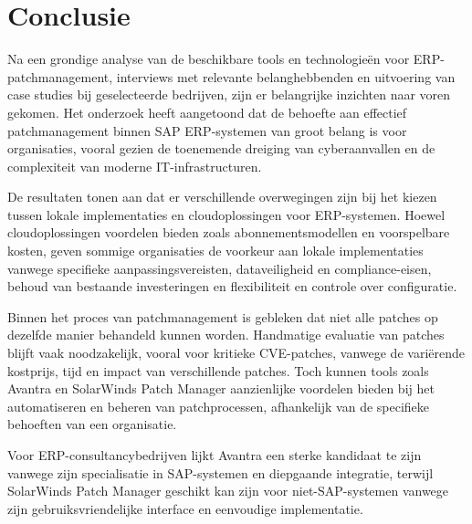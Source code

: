
\chapter{Conclusie}%
\label{ch:conclusie}


Na een grondige analyse van de beschikbare tools en technologieën voor ERP-patchmanagement, interviews met relevante belanghebbenden en uitvoering van case studies bij geselecteerde bedrijven, zijn er belangrijke inzichten naar voren 
gekomen. Het onderzoek heeft aangetoond dat de behoefte aan effectief patchmanagement binnen SAP ERP-systemen van groot belang is voor organisaties, vooral gezien de toenemende dreiging van cyberaanvallen en de complexiteit van moderne IT-infrastructuren.

De resultaten tonen aan dat er verschillende overwegingen zijn bij het kiezen tussen lokale implementaties en cloudoplossingen voor ERP-systemen. Hoewel cloudoplossingen voordelen bieden zoals abonnementsmodellen en voorspelbare kosten, 
geven sommige organisaties de voorkeur aan lokale implementaties vanwege specifieke aanpassingsvereisten, dataveiligheid en compliance-eisen, behoud van bestaande investeringen en flexibiliteit en controle over configuratie.

Binnen het proces van patchmanagement is gebleken dat niet alle patches op dezelfde manier behandeld kunnen worden. Handmatige evaluatie van patches blijft vaak noodzakelijk, vooral voor kritieke CVE-patches, vanwege de variërende kostprijs,
 tijd en impact van verschillende patches. Toch kunnen tools zoals Avantra en SolarWinds Patch Manager aanzienlijke voordelen bieden bij het automatiseren en beheren van patchprocessen, afhankelijk van de specifieke behoeften van een organisatie.

Voor ERP-consultancybedrijven lijkt Avantra een sterke kandidaat te zijn vanwege zijn specialisatie in SAP-systemen en diepgaande integratie, terwijl SolarWinds Patch Manager geschikt kan zijn voor niet-SAP-systemen vanwege zijn gebruiksvriendelijke interface en eenvoudige implementatie.

